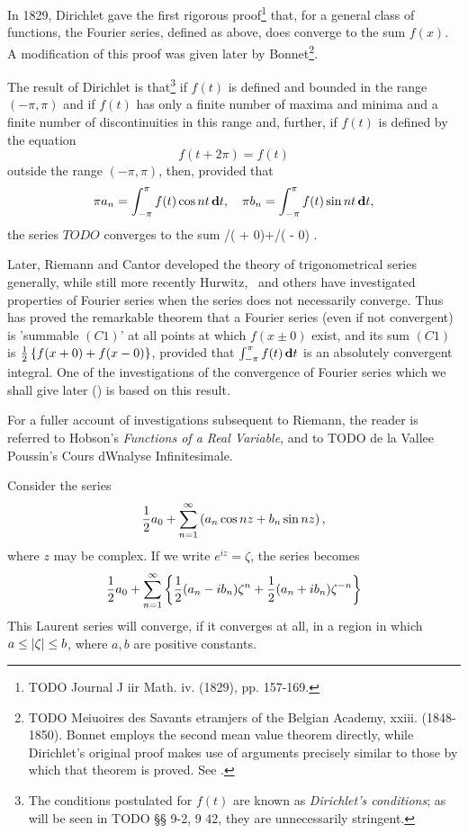 %
%

In 1829, Dirichlet gave the first rigorous proof\footnote{TODO Journal J iir Math. iv. (1829), pp. 157-169.}
that, for a general class of functions, the Fourier series, defined as above, does
converge to the sum $f(x)$. A modification of this proof was given later
by Bonnet\footnote{TODO Meiuoires des Savants etramjers of the Belgian Academy, xxiii.
(1848-1850). Bonnet employs the second mean value theorem directly,
while Dirichlet's original proof makes use of arguments precisely
similar to those by which that theorem is proved. See .}.

The result of Dirichlet
is that\footnote{The conditions postulated for $f(t)$
  are known as \emph{Dirichlet's conditions}; as will be seen in TODO §§ 9-2, 9 42, they are unnecessarily
  stringent.}
if $f(t)$ is defined and bounded in the
range $(-\pi, \pi)$ and if $f(t)$ has only a finite number of maxima and
minima and a finite number of discontinuities in this range and,
further, if $f(t)$ is defined by the equation
$$
f(t + 2 \pi) = f(t)
$$
outside the range $(-\pi, \pi)$, then, provided that
$$
\pi a_{n}
=
\int_{-\pi}^{\pi} f(t) \cos nt \, \mathbf{d} t,
\quad
\pi b_{n}
=
\int_{-\pi}^{\pi} f(t) \sin nt \, \mathbf{d} t,
$$
the series $TODO$ converges to the sum /( +
0)+/( - 0) .

Later, Riemann and Cantor developed the theory of trigonometrical
series generally, while still more recently Hurwitz, \Fejer\ and others
have investigated properties of Fourier series when the series does
not necessarily converge. Thus \Fejer has proved the remarkable
theorem that a Fourier series (even if not convergent) is 'summable
$(C1)$' at all points at which $f(x \pm 0)$ exist, and its sum $(C1)$ is
$\frac{1}{2} \left\{  f(x+0) + f(x-0)  \right\}$,
provided that $\int_{-\pi}^{\pi} f(t) \, \mathbf{d} t$ is an absolutely convergent integral.
One of the investigations of the convergence of Fourier series which we shall give later
() is based on this result.

For a fuller account of investigations subsequent to Riemann, the
reader is referred to Hobson's \emph{Functions of a Real Variable}, and to
TODO de la Vallee Poussin's Cours dWnalyse Infinitesimale.


Consider the series
$$
\frac{1}{2} a_{0}
+
\sum_{n=1}^{\infty}
\left( 
  a_{n} \cos nz
  +
  b_{n} \sin nz
 \right),
$$
where $z$ may be complex. If we write
$e^{iz} = \zeta$, the series becomes
$$
\frac{1}{2} a_{0}
+
\sum_{n=1}^{\infty}
\left\{ 
  \frac{1}{2} (a_{n} - i b_{n}) \zeta^{n}
  +
  \frac{1}{2} (a_{n} + i b_{n}) \zeta^{-n}
 \right\}
$$
This Laurent series will converge, if it converges at all, in a region
in which $a \leq \left| \zeta \right| \leq b$, where $a,b$ are positive
constants.

